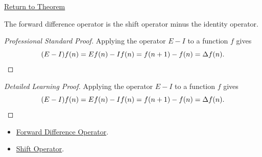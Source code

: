 \newpage
{}
\label{prf:delta-shift-minus-identity}

\begin{remark*}[Return]
\hyperref[thm:delta-shift-minus-identity]{Return to Theorem}
\end{remark*}

\begin{theorem*}[\(\Delta = E-I\)]
The forward difference operator is the shift operator minus the identity
operator.
\end{theorem*}

\begin{proof}[Professional Standard Proof]
\LRAProofBodyStart
Applying the operator \(E-I\) to a function \(f\) gives
\[
(E-I)f(n) = Ef(n) - If(n) = f(n+1) - f(n) = \Delta f(n). \qedhere
\]
\end{proof}

\begin{proof}[Detailed Learning Proof]
\LRAProofBodyStart
Applying the operator \(E-I\) to a function \(f\) gives
\[
(E-I)f(n) = Ef(n) - If(n) = f(n+1) - f(n) = \Delta f(n). \qedhere
\]
\end{proof}

\begin{remark*}
\end{remark*}

\begin{dependencies}
\begin{itemize}
  \item \hyperref[def:forward-difference]{Forward Difference Operator}.
  \item \hyperref[def:shift-operator]{Shift Operator}.
\end{itemize}
\end{dependencies}

\clearpage
